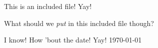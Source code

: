This is an included file!  Yay!

What should we \emph{put} in this included file though?

I know!  How 'bout the date!  Yay!  \today
